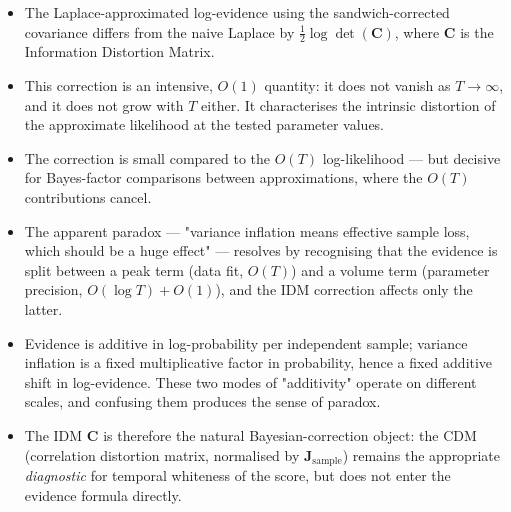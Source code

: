 \documentclass[11pt]{article}
\begin{document}
\begin{itemize}
\item The Laplace-approximated log-evidence using the sandwich-corrected covariance differs from the naive Laplace by $\tfrac{1}{2}\log\det(\mathbf C)$, where $\mathbf C$ is the Information Distortion Matrix.
\item This correction is an intensive, $O(1)$ quantity: it does not vanish as $T \to \infty$, and it does not grow with $T$ either. It characterises the intrinsic distortion of the approximate likelihood at the tested parameter values.
\item The correction is small compared to the $O(T)$ log-likelihood --- but decisive for Bayes-factor comparisons between approximations, where the $O(T)$ contributions cancel.
\item The apparent paradox --- "variance inflation means effective sample loss, which should be a huge effect" --- resolves by recognising that the evidence is split between a peak term (data fit, $O(T)$) and a volume term (parameter precision, $O(\log T) + O(1)$), and the IDM correction affects only the latter.
\item Evidence is additive in log-probability per independent sample; variance inflation is a fixed multiplicative factor in probability, hence a fixed additive shift in log-evidence. These two modes of "additivity" operate on different scales, and confusing them produces the sense of paradox.
\item The IDM $\mathbf C$ is therefore the natural Bayesian-correction object: the CDM (correlation distortion matrix, normalised by $\mathbf J_{\mathrm{sample}}$) remains the appropriate \emph{diagnostic} for temporal whiteness of the score, but does not enter the evidence formula directly.
\end{itemize}
\end{document}
